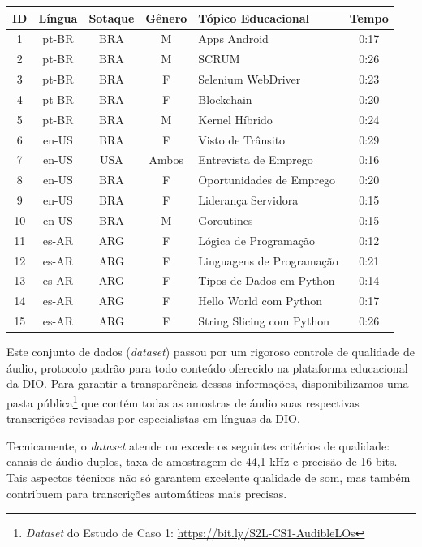 \begin{quadro}[htb]
\centering
\caption{\textit{Dataset} do Estudo de Caso 1 (Áudios Extraídos das Videoaulas)}
\label{quadro:c4:poc-audios-summary}
\begin{tabular}{c|c|c|c|l|c}
\hline
\textbf{ID} & \textbf{Língua} & \textbf{Sotaque} & \textbf{Gênero} & \textbf{Tópico Educacional} & \textbf{Tempo} \\ \hline
1 & pt-BR & BRA & M & Apps Android & 0:17 \\ \hline
2 & pt-BR & BRA & M & SCRUM & 0:26 \\ \hline
3 & pt-BR & BRA & F & Selenium WebDriver & 0:23 \\ \hline
4 & pt-BR & BRA & F & Blockchain & 0:20 \\ \hline
5 & pt-BR & BRA & M & Kernel Híbrido & 0:24 \\ \hline
6 & en-US & BRA & F & Visto de Trânsito & 0:29 \\ \hline
7 & en-US & USA & Ambos & Entrevista de Emprego & 0:16 \\  \hline
8 & en-US & BRA & F & Oportunidades de Emprego & 0:20 \\  \hline
9 & en-US & BRA & F & Liderança Servidora & 0:15 \\  \hline
10 & en-US & BRA & M & Goroutines & 0:15 \\  \hline
11 & es-AR & ARG & F & Lógica de Programação & 0:12 \\  \hline
12 & es-AR & ARG & F & Linguagens de Programação & 0:21 \\  \hline
13 & es-AR & ARG & F & Tipos de Dados em Python & 0:14 \\  \hline
14 & es-AR & ARG & F & Hello World com Python & 0:17 \\  \hline
15 & es-AR & ARG & F & String Slicing com Python & 0:26 \\ \hline
\end{tabular}
\end{quadro}

Este conjunto de dados (\textit{dataset}) passou por um rigoroso controle de qualidade de áudio, protocolo padrão para todo conteúdo oferecido na plataforma educacional da DIO. Para garantir a transparência dessas informações, disponibilizamos uma pasta pública\footnote{\textit{Dataset} do Estudo de Caso 1: \url{https://bit.ly/S2L-CS1-AudibleLOs}} que contém todas as amostras de áudio suas respectivas transcrições revisadas por especialistas em línguas da DIO. 

Tecnicamente, o \textit{dataset} atende ou excede os seguintes critérios de qualidade: canais de áudio duplos, taxa de amostragem de 44,1 kHz e precisão de 16 bits. Tais aspectos técnicos não só garantem excelente qualidade de som, mas também contribuem para transcrições automáticas mais precisas.

